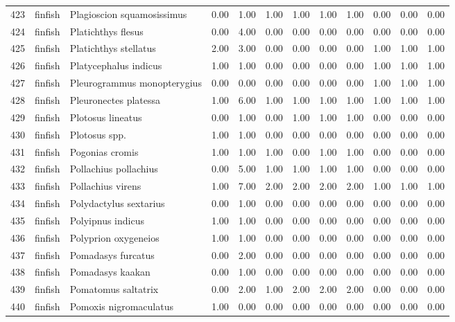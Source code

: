 \begin{table}[ht]
\begin{tabular}{rllrrrrrrrrr}
  423 & finfish & Plagioscion squamosissimus & 0.00 & 1.00 & 1.00 & 1.00 & 1.00 & 1.00 & 0.00 & 0.00 & 0.00 \\ 
  424 & finfish & Platichthys flesus & 0.00 & 4.00 & 0.00 & 0.00 & 0.00 & 0.00 & 0.00 & 0.00 & 0.00 \\ 
  425 & finfish & Platichthys stellatus & 2.00 & 3.00 & 0.00 & 0.00 & 0.00 & 0.00 & 1.00 & 1.00 & 1.00 \\ 
  426 & finfish & Platycephalus indicus & 1.00 & 1.00 & 0.00 & 0.00 & 0.00 & 0.00 & 1.00 & 1.00 & 1.00 \\ 
  427 & finfish & Pleurogrammus monopterygius & 0.00 & 0.00 & 0.00 & 0.00 & 0.00 & 0.00 & 1.00 & 1.00 & 1.00 \\ 
  428 & finfish & Pleuronectes platessa & 1.00 & 6.00 & 1.00 & 1.00 & 1.00 & 1.00 & 1.00 & 1.00 & 1.00 \\ 
  429 & finfish & Plotosus lineatus & 0.00 & 1.00 & 0.00 & 1.00 & 1.00 & 1.00 & 0.00 & 0.00 & 0.00 \\ 
  430 & finfish & Plotosus spp. & 1.00 & 1.00 & 0.00 & 0.00 & 0.00 & 0.00 & 0.00 & 0.00 & 0.00 \\ 
  431 & finfish & Pogonias cromis & 1.00 & 1.00 & 1.00 & 0.00 & 1.00 & 1.00 & 0.00 & 0.00 & 0.00 \\ 
  432 & finfish & Pollachius pollachius & 0.00 & 5.00 & 1.00 & 1.00 & 1.00 & 1.00 & 0.00 & 0.00 & 0.00 \\ 
  433 & finfish & Pollachius virens & 1.00 & 7.00 & 2.00 & 2.00 & 2.00 & 2.00 & 1.00 & 1.00 & 1.00 \\ 
  434 & finfish & Polydactylus sextarius & 0.00 & 1.00 & 0.00 & 0.00 & 0.00 & 0.00 & 0.00 & 0.00 & 0.00 \\ 
  435 & finfish & Polyipnus indicus & 1.00 & 1.00 & 0.00 & 0.00 & 0.00 & 0.00 & 0.00 & 0.00 & 0.00 \\ 
  436 & finfish & Polyprion oxygeneios & 1.00 & 1.00 & 0.00 & 0.00 & 0.00 & 0.00 & 0.00 & 0.00 & 0.00 \\ 
  437 & finfish & Pomadasys furcatus & 0.00 & 2.00 & 0.00 & 0.00 & 0.00 & 0.00 & 0.00 & 0.00 & 0.00 \\ 
  438 & finfish & Pomadasys kaakan & 0.00 & 1.00 & 0.00 & 0.00 & 0.00 & 0.00 & 0.00 & 0.00 & 0.00 \\ 
  439 & finfish & Pomatomus saltatrix & 0.00 & 2.00 & 1.00 & 2.00 & 2.00 & 2.00 & 0.00 & 0.00 & 0.00 \\ 
  440 & finfish & Pomoxis nigromaculatus & 1.00 & 0.00 & 0.00 & 0.00 & 0.00 & 0.00 & 0.00 & 0.00 & 0.00 \\ 

\end{tabular}
\end{table}
